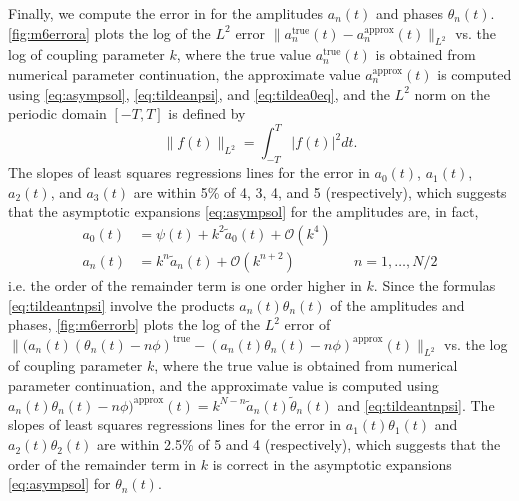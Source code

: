 \documentclass[11pt,reqno]{amsart}
\begin{document}
Finally, we compute the error in for the amplitudes $a_n(t)$ and phases $\theta_n(t)$. \cref{fig:m6errora} plots the log of the $L^2$ error $\| a_n^{\text{true}}(t) - a_n^{\text{approx}}(t) \|_{L^2}$ vs. the log of coupling parameter $k$, where the true value $a_n^{\text{true}}(t)$ is obtained from numerical parameter continuation, the approximate value $a_n^{\text{approx}}(t)$ is computed using \cref{eq:asympsol}, \cref{eq:tildeanpsi}, and \cref{eq:tildea0eq}, and the $L^2$ norm on the periodic domain $[-T,T]$ is defined by
\[
\| f(t) \|_{L^2} = \int_{-T}^T |f(t)|^2 dt.
\] 
The slopes of least squares regressions lines for the error in $a_0(t)$, $a_1(t)$, $a_2(t)$, and $a_3(t)$ are within 5\% of 4, 3, 4, and 5 (respectively), which suggests that the asymptotic expansions \cref{eq:asympsol} for the amplitudes are, in fact, 
\begin{equation}\label{eq:asympsol2}
\begin{aligned}
a_0(t) &= \psi(t) + k^2 \tilde{a}_0(t) + \mathcal{O}(k^4) \\
a_n(t) &= k^n \tilde{a}_n(t) + \mathcal{O}(k^{n+2}) && n = 1, \dots, N/2
\end{aligned}
\end{equation}
i.e. the order of the remainder term is one order higher in $k$. Since the formulas \cref{eq:tildeantnpsi} involve the products $a_n(t) \theta_n(t)$ of the amplitudes and phases, \cref{fig:m6errorb} plots the log of the $L^2$ error of $\| (a_n(t) (\theta_n(t) - n \phi)^{\text{true}} - (a_n(t) \theta_n(t)- n \phi)^{\text{approx}}(t) \|_{L^2}$ vs. the log of coupling parameter $k$, where the true value is obtained from numerical parameter continuation, and the approximate value is computed using 
$a_n(t) \theta_n(t) - n \phi )^{\text{approx}}(t) = k^{N-n} \tilde{a}_n(t) \tilde{\theta}_n(t)$ and \cref{eq:tildeantnpsi}. The slopes of least squares regressions lines for the error in $a_1(t)\theta_1(t)$ and $a_2(t)\theta_2(t)$ are within 2.5\% of 5 and 4 (respectively), which suggests that the order of the remainder term in $k$ is correct in the asymptotic expansions \cref{eq:asympsol} for $\theta_n(t)$.
\end{document}
